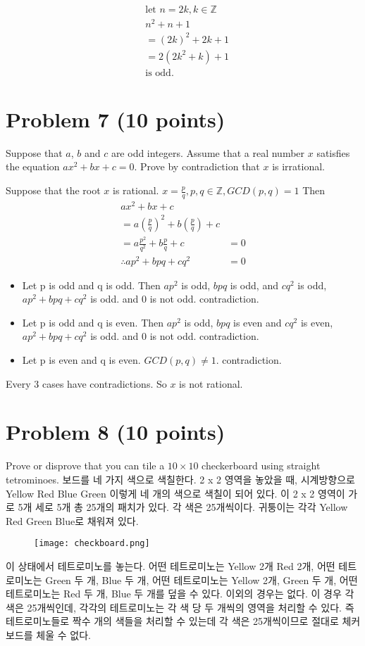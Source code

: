 \documentclass[english]{article}
\begin{document}
\begin{align*}
  & \text{let } n = 2k, k \in \mathbb{Z} \\
  & n^2 + n + 1  \\
  &= (2k)^2 + 2k + 1 \\
  &= 2(2k^2 + k) + 1 \\
  & \text{is odd.}
\end{align*}



\section*{Problem 7 (10 points)} Suppose that $a$, $b$ and $c$  are odd integers. Assume that a real number $x$ satisfies the equation $ax^2+bx+c=0$. Prove by contradiction that $x$ is irrational.

Suppose that the root $x$ is rational. $x = \frac pq, p, q \in \mathbb{Z}, GCD(p, q) = 1$
Then 
\begin{align*}
  ax^2 + bx + c & \\
  = a\left(\frac pq\right)^2 + b\left(\frac pq \right) + c & \\
  = a\frac{p^2}{q^2} + b\frac pq + c &= 0 \\
  \therefore ap^2 + bpq + cq^2 &= 0
\end{align*}
\begin{itemize}
  \item Let p is odd and q is odd. Then $ap^2$ is odd, $bpq$ is odd, and $cq^2$ is odd, $ap^2 + bpq + cq^2$ is odd. and 0 is not odd. contradiction.
  \item Let p is odd and q is even. Then $ap^2$ is odd, $bpq$ is even and $cq^2$ is even, $ap^2 + bpq + cq^2$ is odd. and 0 is not odd. contradiction.
  \item Let p is even and q is even. $GCD(p, q) \neq 1$. contradiction.
\end{itemize}
Every 3 cases have contradictions. So $x$ is not rational.

\section*{Problem 8 (10 points)} Prove or disprove that you can tile a $10 \times 10$ checkerboard using straight tetrominoes.
보드를 네 가지 색으로 색칠한다. 2 x 2 영역을 놓았을 때, 시계방향으로 Yellow Red Blue Green 이렇게 네 개의 색으로 색칠이 되어 있다. 이 2 x 2 영역이 가로 5개 세로 5개 총 25개의 패치가 있다. 각 색은 25개씩이다. 귀퉁이는 각각 Yellow Red Green Blue로 채워져 있다.
\begin{figure}[H]
  \texttt{[image: checkboard.png]}
\end{figure}
이 상태에서 테트로미노를 놓는다. 어떤 테트로미노는 Yellow 2개 Red 2개, 어떤 테트로미노는 Green 두 개, Blue 두 개, 어떤 테트로미노는 Yellow 2개, Green 두 개, 어떤 테트로미노는 Red 두 개, Blue 두 개를 덮을 수 있다. 이외의 경우는 없다.
이 경우 각 색은 25개씩인데, 각각의 테트로미노는 각 색 당 두 개씩의 영역을 처리할 수 있다. 즉 테트로미노들로 짝수 개의 색들을 처리할 수 있는데 각 색은 25개씩이므로 절대로 체커보드를 체울 수 없다.
\end{document}
